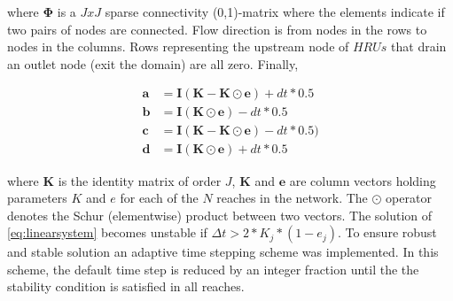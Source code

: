 where $\mathbf{\Phi}$ is a $JxJ$ sparse connectivity (0,1)-matrix where the elements indicate if two pairs of nodes are connected. Flow direction is from nodes in the rows to nodes in the columns. Rows representing the upstream node of $HRUs$ that drain an outlet node (exit the domain) are all zero. Finally,


\begin{align}
\mathbf{a} &= \mathbf{I} (\mathbf{K}-\mathbf{K\odot e}) + dt * 0.5\\
\mathbf{b} &= \mathbf{I} (\mathbf{K\odot e}) - dt * 0.5\\
\mathbf{c} &= \mathbf{I} (\mathbf{K}-\mathbf{K\odot e}) - dt * 0.5)\\
\mathbf{d} &= \mathbf{I} (\mathbf{K\odot e}) + dt * 0.5
\end{align}

\noindent where $\mathbf{K}$ is the identity matrix of order $J$, $\mathbf{K}$ and $\mathbf{e}$ are column vectors holding parameters $K$ and $e$ for each of the $N$ reaches in the network. The $\odot$ operator denotes the Schur (elementwise) product between two vectors.
The solution of \eqref{eq:linearsystem} becomes unstable if $\Delta t > 2 * K_j * (1 - e_j)$. To ensure robust and stable solution an adaptive time stepping scheme was implemented. In this scheme, the default time step is reduced by an integer fraction until the the stability condition is satisfied in all reaches. 